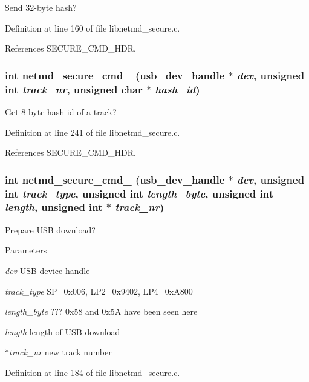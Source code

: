 Send 32-\/byte hash? 

Definition at line 160 of file libnetmd\_\-secure.c.

References SECURE\_\-CMD\_\-HDR.
\subsubsection[{netmd\_\-secure\_\-cmd\_\-23}]{\setlength{\rightskip}{0pt plus 5cm}int netmd\_\-secure\_\-cmd\_ (usb\_\-dev\_\-handle $\ast$ {\em dev}, \/  unsigned int {\em track\_\-nr}, \/  unsigned char $\ast$ {\em hash\_\-id})}\label{libnetmd__secure_8c_a57054c7202568b9a0453470108ca8053}


Get 8-\/byte hash id of a track? 

Definition at line 241 of file libnetmd\_\-secure.c.

References SECURE\_\-CMD\_\-HDR.
\subsubsection[{netmd\_\-secure\_\-cmd\_\-28}]{\setlength{\rightskip}{0pt plus 5cm}int netmd\_\-secure\_\-cmd\_ (usb\_\-dev\_\-handle $\ast$ {\em dev}, \/  unsigned int {\em track\_\-type}, \/  unsigned int {\em length\_\-byte}, \/  unsigned int {\em length}, \/  unsigned int $\ast$ {\em track\_\-nr})}\label{libnetmd__secure_8c_a512d29b097dcd5339423d9c28711754b}


Prepare USB download? 
\begin{DoxyParams}{Parameters}
\item[{\em dev}]USB device handle \item[{\em track\_\-type}]SP=0x006, LP2=0x9402, LP4=0xA800 \item[{\em length\_\-byte}]??? 0x58 and 0x5A have been seen here \item[{\em length}]length of USB download \item[{\em $\ast$track\_\-nr}]new track number \end{DoxyParams}


Definition at line 184 of file libnetmd\_\-secure.c.

